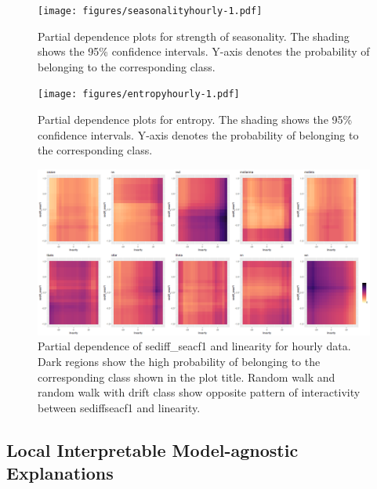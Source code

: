 \documentclass[11pt,a4paper,]{article}
\begin{document}
\begin{figure}
\centering
\texttt{[image: figures/seasonalityhourly-1.pdf]}
\caption{\label{fig:seasonalityhourly}Partial dependence plots for strength of seasonality. The shading shows the 95\% confidence intervals. Y-axis denotes the probability of belonging to the corresponding class.}
\end{figure}

\begin{figure}
\centering
\texttt{[image: figures/entropyhourly-1.pdf]}
\caption{\label{fig:entropyhourly}Partial dependence plots for entropy. The shading shows the 95\% confidence intervals. Y-axis denotes the probability of belonging to the corresponding class.}
\end{figure}

\begin{figure}
\centering
\includegraphics{figures/htwopdp-1.png}
\caption{\label{fig:htwopdp}Partial dependence of sediff\_seacf1 and linearity for hourly data. Dark regions show the high probability of belonging to the corresponding class shown in the plot title. Random walk and random walk with drift class show opposite pattern of interactivity between sediffseacf1 and linearity.}
\end{figure}

\hypertarget{local-interpretable-model-agnostic-explanations}{%
\subsection{Local Interpretable Model-agnostic Explanations}\label{local-interpretable-model-agnostic-explanations}}
\end{document}
